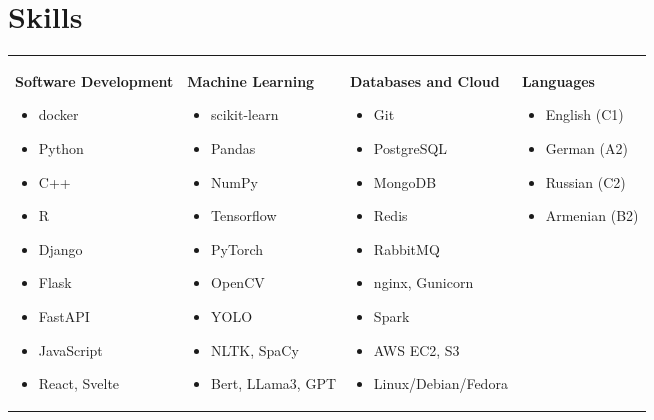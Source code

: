 \documentclass{ExpressiveResume}
\begin{document}
\section{Skills}
\noindent\begin{tabularx}{\textwidth}{@{}X@{}X@{}X@{}X@{}}
\textbf{Software Development}
\begin{itemize}
    \item docker
    \item Python
    \item C++
    \item R
    \item Django
    \item Flask
    \item FastAPI
    \item JavaScript
    \item React, Svelte
\end{itemize}
&
\textbf{Machine Learning}
\begin{itemize}
    \item scikit-learn
    \item Pandas
    \item NumPy
    \item Tensorflow
    \item PyTorch
    \item OpenCV
    \item YOLO
    \item NLTK, SpaCy
    \item Bert, LLama3, GPT
\end{itemize}
&
\textbf{Databases and Cloud}
\begin{itemize}
    \item Git
    \item PostgreSQL
    \item MongoDB
    \item Redis
    \item RabbitMQ
    \item nginx, Gunicorn
    \item Spark
    \item AWS EC2, S3
    \item Linux/Debian/Fedora
\end{itemize}
&
\textbf{Languages}
\begin{itemize}
    \item English (C1)
    \item German (A2)
    \item Russian (C2)
    \item Armenian (B2)
\end{itemize}
\end{tabularx}
\end{document}
